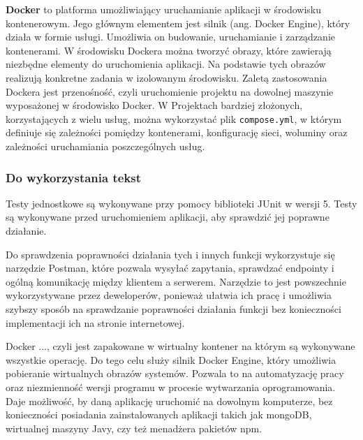 \textbf{Docker} to platforma umożliwiający uruchamianie aplikacji w środowisku kontenerowym. Jego głównym elementem jest silnik (ang. Docker Engine), który działa w formie usługi. Umożliwia on budowanie, uruchamianie i zarządzanie kontenerami. W środowisku Dockera można tworzyć obrazy, które zawierają niezbędne elementy do uruchomienia aplikacji. Na podstawie tych obrazów realizują konkretne zadania w izolowanym środowisku. Zaletą zastosowania Dockera jest przenośność, czyli uruchomienie projektu na dowolnej maszynie wyposażonej w środowisko Docker. W Projektach bardziej złożonych, korzystających z wielu usług, można wykorzystać plik \texttt{compose.yml}, w którym definiuje się zależności pomiędzy kontenerami, konfigurację sieci, woluminy oraz zależności uruchamiania poszczególnych usług.

\subsubsection*{Do wykorzystania tekst}
Testy jednostkowe są wykonywane przy pomocy biblioteki JUnit w wersji 5. Testy są wykonywane przed uruchomieniem aplikacji, aby sprawdzić jej poprawne działanie. 


Do sprawdzenia poprawności działania tych i innych funkcji wykorzystuje się narzędzie Postman, które pozwala wysyłać zapytania, sprawdzać endpointy i ogólną komunikację między klientem a serwerem. Narzędzie to jest powszechnie wykorzystywane przez deweloperów, ponieważ ułatwia ich pracę i umożliwia szybszy sposób na sprawdzanie poprawności działania funkcji bez konieczności implementacji ich na stronie internetowej. 

Docker ..., czyli jest zapakowane w wirtualny kontener na którym są wykonywane wszystkie operację. Do tego celu służy silnik Docker Engine, który umożliwia pobieranie wirtualnych obrazów systemów. Pozwala to na automatyzację pracy oraz niezmienność wersji programu w procesie wytwarzania oprogramowania. Daje możliwość, by daną aplikację uruchomić na dowolnym komputerze, bez konieczności posiadania zainstalowanych aplikacji takich jak mongoDB, wirtualnej maszyny Javy, czy też menadżera pakietów npm.